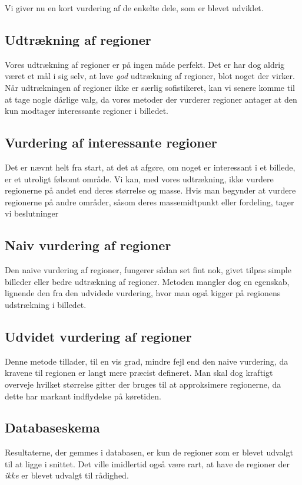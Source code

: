 {
{\sffamily Vi giver nu en kort vurdering af de enkelte dele, som er
blevet udviklet.
}

\subsection{Udtrækning af regioner}
Vores udtrækning af regioner er på ingen måde perfekt. Det er har dog
aldrig været et mål i sig selv, at lave \emph{god} udtrækning af
regioner, blot noget der virker. Når udtrækningen af regioner ikke er
særlig sofistikeret, kan vi senere komme til at tage nogle dårlige valg,
da vores metoder der vurderer regioner antager at den kun modtager
interessante regioner i billedet.

\subsection{Vurdering af interessante regioner}
Det er nævnt helt fra start, at det at afgøre, om noget er interessant i
et billede, er et utroligt følsomt område. Vi kan, med vores udtrækning,
ikke vurdere regionerne på andet end deres størrelse og masse. Hvis man
begynder at vurdere regionerne på andre områder, såsom deres
massemidtpunkt eller fordeling, tager vi beslutninger 

\subsection{Naiv vurdering af regioner}
Den naive vurdering af regioner, fungerer sådan set fint nok, givet
tilpas simple billeder eller bedre udtrækning af regioner. Metoden
mangler dog en egenskab, lignende den fra den udvidede vurdering, hvor
man også kigger på regionens udstrækning i billedet.

\subsection{Udvidet vurdering af regioner}
Denne metode tillader, til en vis grad, mindre fejl end den naive
vurdering, da kravene til regionen er langt mere præcist defineret. Man
skal dog kraftigt overveje hvilket størrelse gitter der bruges til at
approksimere regionerne, da dette har markant indflydelse på køretiden.

\subsection{Databaseskema}
Resultaterne, der gemmes i databasen, er kun de regioner som er blevet
udvalgt til at ligge i snittet. Det ville imidlertid også være rart, at
have de regioner der \emph{ikke} er blevet udvalgt til rådighed.

}

